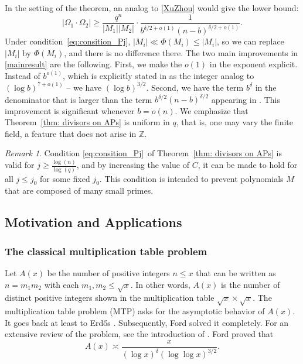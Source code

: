 \documentclass[12pt]{amsart}
\numberwithin{equation}{section}
\theoremstyle{definition}
\theoremstyle{remark}
\newtheorem{remark}{Remark}
\newcommand{\ZZ}{\mathbb{Z}}
\begin{document}
    In the setting of the theorem, an analog to \eqref{XuZhou} would give the lower bound:
    \[
        |\Omega_1\cdot \Omega_2|\geq \frac{q^n}{|M_1||M_2|} \cdot\frac{1}{b^{\delta/2+o(1)}(n-b)^{\delta/2+o(1)}}.
    \]
    Under condition~\ref{eq:consition_Pj}, $|M_i|\ll \Phi(M_i)\leq |M_i|$, so we can replace $|M_i|$ by $\Phi(M_i)$, and there is no difference there.
    The two main improvements in \eqref{mainresult} are the following. First, we make the $o(1)$ in the exponent explicit. Instead of $b^{o(1)}$, which is explicitly stated in \cite{product_sets_of_APs} as the integer analog to $(\log b)^{7+o(1)}$ -- we have $(\log b)^{3/2}$. Second, we have the term $b^{\delta}$ in the denominator that is larger than the term $b^{\delta/2}(n-b)^{\delta/2}$ appearing in \cite{product_sets_of_APs}. This improvement is significant whenever $b=o(n)$.
    We emphasize that Theorem~\ref{thm: divisors on APs} is uniform in $q$, that is, one may vary the finite field, a feature that does not arise in $\ZZ$.
    \begin{remark}
        Condition \ref{eq:consition_Pj}\ of Theorem~\ref{thm: divisors on APs} is valid for $j \geq \frac{\log(n)}{\log(q)}$, and by increasing the value of $C$, it can be made to hold for all $j \leq j_0$ for some fixed $j_0$. This condition is intended to prevent polynomials $M$ that are composed of many small primes.
    \end{remark}
    \subsection{Motivation and Applications}
    \subsubsection{The classical multiplication table problem}
    Let $A(x)$ be the number of positive integers $n \leq x$ that can be written as $n=m_1m_2$ with each $m_1,m_2 \leq \sqrt{x}$. In other words, $A(x)$ is the number of distinct positive integers shown in the multiplication table $\sqrt{x} \times \sqrt{x}$. The multiplication table problem (MTP) asks for the asymptotic behavior of $A(x)$. It goes back at least to Erd\H{o}s \cite{Erdos_MT}. Subsequently, Ford \cite{Ford_MT} solved it completely. For an extensive review of the problem, see the introduction of \cite{Ford_MT}.  
    Ford proved that 
    \begin{equation}\label{eq:Ford}
        A(x) \asymp \frac{x}{(\log x)^\delta (\log \log x)^{3/2}}.
    \end{equation}
\end{document}
